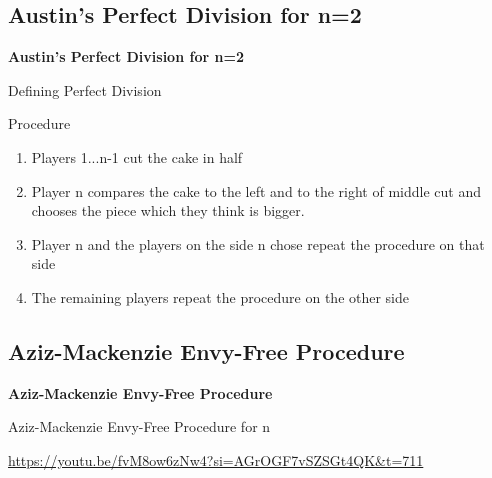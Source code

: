 \documentclass[aspectratio=169,xcolor=dvipsnames]{beamer}
\begin{document}
\subsection{Austin's Perfect Division for n=2}
\begin{frame}
	\Huge{\centerline{\textbf{Austin's Perfect Division for n=2}}}
\end{frame}
\begin{frame}{Defining Perfect Division}
	
\end{frame}
\begin{frame}{Procedure}
	\begin{enumerate}
		\item Players 1...n-1 cut the cake in half
		\item Player n compares the cake to the left and to the right of middle cut and chooses the piece which they think is bigger.\pause
		\item Player n and the players on the side n chose repeat the procedure on that side
		\item The remaining players repeat the procedure on the other side
	\end{enumerate}
\end{frame}
\subsection{Aziz-Mackenzie Envy-Free Procedure}
\begin{frame}
	\Huge{\centerline{\textbf{Aziz-Mackenzie Envy-Free Procedure}}}
\end{frame}
\begin{frame}{Aziz-Mackenzie Envy-Free Procedure for n}
	\centerline{\url{https://youtu.be/fvM8ow6zNw4?si=AGrOGF7vSZSGt4QK&t=711}}
\end{frame}
\end{document}
